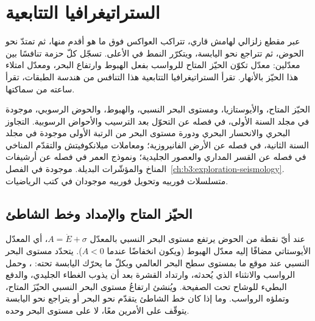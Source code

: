 \chapter{الستراتيغرافيا التتابعية}\label{ch:b3:sequence-stratigraphy}

عبر مقطع زلزالي لهامش قاري، تتراكب العواكس فوق ما هو أقدم منها،
ثم تمتدّ نحو الحوض، ثم تتراجع نحو اليابسة، ويتكرّر
النمط في الأعلى. تسجّل كلّ حزمة تنافسًا بين
معدّلين: معدّل تكوّن الحيّز المتاح للرواسب بفعل الهبوط وارتفاع البحر،
ومعدّل امتلاء هذا الحيّز بالأنهار. تقرأ الستراتيغرافيا
التتابعية هذا التنافس من هندسة الطبقات،  تقرأ ساعته من سماكتها.

\begin{recall}
الحيّز المتاح، والأيوستازيا، ومستوى البحر النسبي، والهبوط، والحوض الرسوبي،
موجودة في مجلد السنة الأولى، في فصله عن التحوّل بعد الترسيب والأحواض الرسوبية.
التجاوز البحري والانحسار البحري ودورة مستوى البحر من الرتبة الأولى
موجودة في مجلد السنة الثانية، في فصله عن الأرض الفانيروزية؛
ومعاملات ميلانكوفيتش والتقدّم المناخي في فصله عن القسر المداري
والعصور الجليدية؛ ونموذج العمر في فصله عن أرشيفات المناخ
والمؤشّرات البديلة.      موجودة في الفصل~\ref{ch:b3:exploration-seismology}. متسلسلات فورييه
وتحويل فورييه موجودان في كتب الرياضيات.
\end{recall}

\section{الحيّز المتاح والإمداد وخط الشاطئ}\label{sec:b3:sequence-stratigraphy:shoreline}

عند أيّ نقطة من الحوض يرتفع مستوى البحر النسبي بالمعدّل $A = \dot E
+ \sigma$، أي المعدّل الأيوستاتي مضافًا إليه معدّل الهبوط (ويكون انخفاضًا عندما $A < 0$).
يتحدّد مستوى البحر النسبي عند موقع ما بمستوى سطح البحر العالمي وبكلّ
ما يحرّك اليابسة تحته: ، وحمل
الرواسب والانثناء الذي يُحدثه، وارتداد القشرة بعد أن يذوب الغطاء
الجليدي، والدفع البطيء للوشاح تحت الصفيحة. ويُنشئ ارتفاعُ
مستوى البحر النسبي الحيّزَ المتاح، وتملؤه الرواسب. وما إذا كان
خط الشاطئ يتقدّم نحو البحر أو يتراجع نحو اليابسة يتوقّف على الأمرين معًا، لا على مستوى البحر
وحده.

